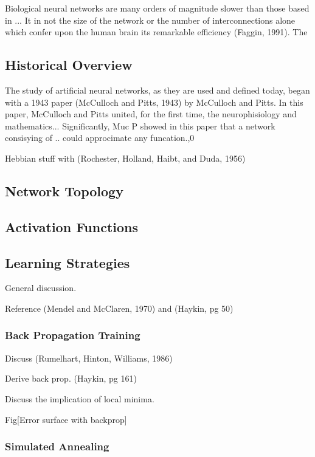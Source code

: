 \documentclass[11pt]{afthesis}
\begin{document}
Biological neural networks are many orders of magnitude slower than those based in ... It in not the size of the network or the number of interconnections alone which confer upon the human brain its remarkable efficiency (Faggin, 1991). The  


\subsection{Historical Overview}

The study of artificial neural networks, as they are used and defined today, began with a 1943 paper (McCulloch and Pitts, 1943) by McCulloch and Pitts. In this paper, McCulloch and Pitts united, for the first time, the neurophisiology and mathematics... Significantly, Muc P showed in this paper that a network consisying of .. could approcimate any funcation.,0

Hebbian stuff with (Rochester, Holland, Haibt, and Duda, 1956)


\subsection{Network Topology}

\subsection{Activation Functions}

\subsection{Learning Strategies}

General discussion.

Reference (Mendel and McClaren, 1970) and (Haykin, pg 50)

\subsubsection{Back Propagation Training}

Discuss (Rumelhart, Hinton, Williams, 1986)

Derive back prop. (Haykin, pg 161)

Discuss the implication of local minima.

Fig[Error surface with backprop]


\subsubsection{Simulated Annealing}
\end{document}
